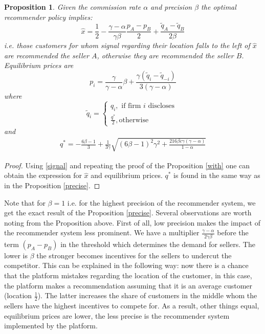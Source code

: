 \documentclass[a4paper]{article}
\newtheorem{proposition}[theorem]{Proposition}
\begin{document}
\begin{proposition}\label{notprecise}
	Given the commission rate $\alpha$ and precision $\beta$ the optimal recommender policy implies:
	$$\hat{x} = \frac{1}{2} - \frac{\gamma - \alpha}{\gamma \beta} \frac{p_A-p_B}{2} + \frac{\tilde{q}_A - \tilde{q}_B}{2 \beta}$$
	i.e. those customers for whom signal regarding their location falls to the left of $\hat{x}$ are recommended the seller $A$, otherwise they are recommended the seller $B$.
	Equilibrium prices are
	$$p_i = \frac{\gamma}{\gamma - \alpha} \beta + \frac{\gamma(\tilde{q}_i - \tilde{q}_{-i})}{3(\gamma - \alpha)}$$
	where
	$$\tilde{q}_i = \begin{cases}
	q_i, \text{ if firm }i\text{ discloses }\\
	\frac{q^*}{2}, \text{otherwise}
	\end{cases}$$
	and \begin{align}\label{thres_b}
	q^* = -\frac{6 \beta - 1}{3} + \frac{1}{3 \gamma} \sqrt{(6 \beta - 1)^2\gamma^2 + \frac{216 \beta c \gamma (\gamma - \alpha)}{1-\alpha}}
	\end{align}
\end{proposition}
\begin{proof}
	Using \eqref{signal} and repeating the proof of the Proposition \ref{with} one can obtain the expression for $\hat{x}$ and equilibrium prices. $q^*$ is found in the same way as in the Proposition \ref{precise}.
\end{proof}
Note that for $\beta = 1$ i.e. for the highest precision of the recommender system, we get the exact result of the Proposition \ref{precise}. Several observations are worth noting from the Proposition above. First of all, low precision makes the impact of the recommender system less prominent. We have a multiplier $\frac{\gamma - \alpha}{2 \gamma \beta}$ before the term $(p_A - p_B)$ in the threshold which determines the demand for sellers. The lower is $\beta$ the stronger becomes incentives for the sellers to undercut the competitor. This can be explained in the following way: now there is a chance that the platform mistakes regarding the location of the customer, in this case, the platform makes a recommendation assuming that it is an average customer (location $\frac{1}{2}$). The latter increases the share of customers in the middle whom the sellers have the highest incentives to compete for. As a result, other things equal, equilibrium prices are lower, the less precise is the recommender system implemented by the platform.
\end{document}

